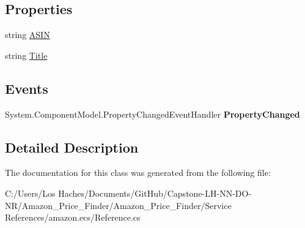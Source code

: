 \subsection*{Properties}
\begin{DoxyCompactItemize}
\item 
\hypertarget{class_amazon___price___finder_1_1amazon_1_1ecs_1_1_collections_collection_collection_item_a2f2d7e56b8a3d3454650f5b2d992a42f}{string \hyperlink{class_amazon___price___finder_1_1amazon_1_1ecs_1_1_collections_collection_collection_item_a2f2d7e56b8a3d3454650f5b2d992a42f}{A\-S\-I\-N}}\label{class_amazon___price___finder_1_1amazon_1_1ecs_1_1_collections_collection_collection_item_a2f2d7e56b8a3d3454650f5b2d992a42f}

\begin{DoxyCompactList}\small\item\em \end{DoxyCompactList}\item 
\hypertarget{class_amazon___price___finder_1_1amazon_1_1ecs_1_1_collections_collection_collection_item_acb43e56d1ad5ee433e1c12ecfe17632a}{string \hyperlink{class_amazon___price___finder_1_1amazon_1_1ecs_1_1_collections_collection_collection_item_acb43e56d1ad5ee433e1c12ecfe17632a}{Title}}\label{class_amazon___price___finder_1_1amazon_1_1ecs_1_1_collections_collection_collection_item_acb43e56d1ad5ee433e1c12ecfe17632a}

\begin{DoxyCompactList}\small\item\em \end{DoxyCompactList}\end{DoxyCompactItemize}
\subsection*{Events}
\begin{DoxyCompactItemize}
\item 
\hypertarget{class_amazon___price___finder_1_1amazon_1_1ecs_1_1_collections_collection_collection_item_a15f1c878145c197f0b4a1a0563ef4b74}{System.\-Component\-Model.\-Property\-Changed\-Event\-Handler {\bfseries Property\-Changed}}\label{class_amazon___price___finder_1_1amazon_1_1ecs_1_1_collections_collection_collection_item_a15f1c878145c197f0b4a1a0563ef4b74}

\end{DoxyCompactItemize}


\subsection{Detailed Description}


The documentation for this class was generated from the following file\-:\begin{DoxyCompactItemize}
\item 
C\-:/\-Users/\-Los Haches/\-Documents/\-Git\-Hub/\-Capstone-\/\-L\-H-\/\-N\-N-\/\-D\-O-\/\-N\-R/\-Amazon\-\_\-\-Price\-\_\-\-Finder/\-Amazon\-\_\-\-Price\-\_\-\-Finder/\-Service References/amazon.\-ecs/Reference.\-cs\end{DoxyCompactItemize}
